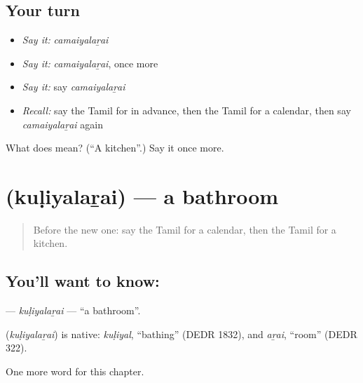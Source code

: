 \subsection*{Your turn}
\begin{itemize}
\raggedright
  \item \emph{Say it:} \emph{camaiyalaṟai}
  \item \emph{Say it:} \emph{camaiyalaṟai}, once more
  \item \emph{Say it:} say \emph{camaiyalaṟai}
  \item \emph{Recall:} say the Tamil for in advance, then the Tamil for a calendar, then say \emph{camaiyalaṟai} again
\end{itemize}

\begin{tcolorbox}[breakable,colback=teal!4,colframe=teal!35!black,title={Before you move on}]
What does  mean? (\textquotedblleft{}A kitchen\textquotedblright{}.) Say it once more.
\end{tcolorbox}
\section[\texorpdfstring{\ta{குளியலறை} (kuḷiyalaṟai)}{குளியலறை (kuḷiyalaṟai)}]{ (kuḷiyalaṟai) — a bathroom}

\label{lesson:TA-C173-kuliyalarai}



\begin{quote}
Before the new one: say the Tamil for a calendar, then the Tamil for a kitchen.
\end{quote}

\subsection*{You'll want to know: }
\textbf{} — \emph{kuḷiyalaṟai} — \textquotedblleft{}a bathroom\textquotedblright{}.

\begin{cousinweb}
\textbf{} (\emph{kuḷiyalaṟai}) is native: \emph{kuḷiyal}, \textquotedblleft{}bathing\textquotedblright{} (DEDR 1832), and \emph{aṟai}, \textquotedblleft{}room\textquotedblright{} (DEDR 322).
\end{cousinweb}

\begin{grammarlens}[title={What you've built}]
One more word for this chapter.
\end{grammarlens}

